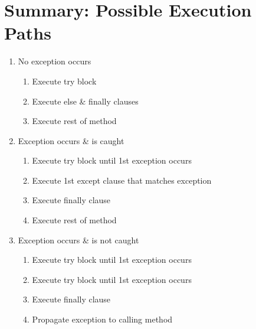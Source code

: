 \documentclass{article}
\begin{document}
\section{Summary: Possible Execution Paths}
    \begin{multicols}{2}
        \begin{enumerate}
            \item No exception occurs
                \begin{enumerate}
                    \item Execute try block
                    \item Execute else \& finally clauses
                    \item Execute rest of method
                \end{enumerate}
            \item Exception occurs \& is caught
                \begin{enumerate}
                    \item Execute try block until 1st exception occurs
                    \item Execute 1st except clause that matches exception
                    \item Execute finally clause
                    \item Execute rest of method
                \end{enumerate}
            \item Exception occurs \& is not caught
                \begin{enumerate}
                    \item Execute try block until 1st exception occurs
                    \item Execute try block until 1st exception occurs
                    \item Execute finally clause
                    \item Propagate exception to calling method
                \end{enumerate}
        \end{enumerate}
    \end{multicols}

\end{document}
